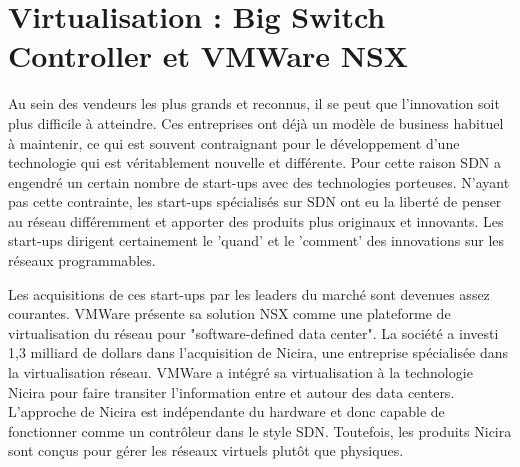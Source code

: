 \section{Virtualisation : Big Switch Controller et VMWare NSX}

Au sein des vendeurs les plus grands et reconnus, il se peut que l'innovation soit plus difficile à atteindre. Ces entreprises ont déjà un modèle de business habituel à maintenir, ce qui est souvent contraignant pour le développement d'une technologie qui est véritablement nouvelle et différente. Pour cette raison SDN a engendré un certain nombre de start-ups avec des technologies porteuses. N'ayant pas cette contrainte, les start-ups spécialisés sur SDN ont eu la liberté de penser au réseau différemment et apporter des produits plus originaux et innovants. Les start-ups dirigent certainement le 'quand' et le 'comment' des innovations sur les réseaux programmables. \cite{startupsSDN}





Les acquisitions de ces start-ups par les leaders du marché sont devenues assez courantes. VMWare présente sa solution NSX comme une plateforme de virtualisation du réseau pour "software-defined data center". La société a investi 1,3 milliard de dollars dans l'acquisition de Nicira, une entreprise spécialisée dans la virtualisation réseau.
VMWare a intégré sa virtualisation à la technologie Nicira pour faire transiter l'information entre et autour des data centers. L'approche de Nicira est indépendante du hardware et donc capable de fonctionner comme un contrôleur dans le style SDN. Toutefois, les produits Nicira sont conçus pour gérer les réseaux virtuels plutôt que physiques. \cite{ExecutiveGuideToSDNBigSwitch}



